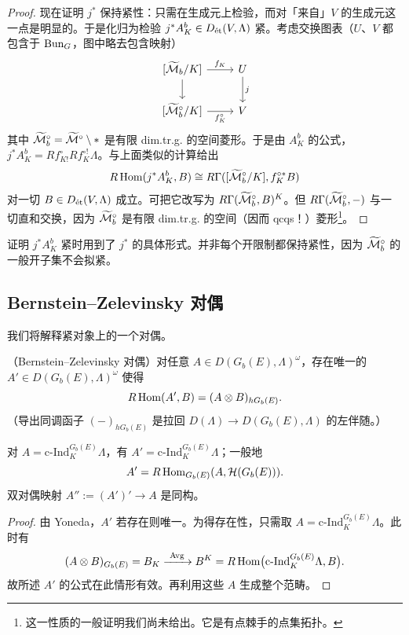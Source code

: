 \begin{proof}
现在证明 $j^*$ 保持紧性：只需在生成元上检验，而对「来自」$V$ 的生成元这一点是明显的。于是化归为检验 $j^*A^b_K\in D_{\et}(V,\Lambda)$ 紧。考虑交换图表（$U$、$V$ 都包含于 $\Bun_G$，图中略去包含映射）
\[
\begin{tikzcd}
{}[\wt\cM_b/K] \arrow[r, "f_K"] \arrow[d] & U \arrow[d, "j"] \\
{}[\wt\cM_b^\circ/K] \arrow[r, "f_K^\circ"'] & V
\end{tikzcd}
\]
其中 $\wt\cM_b^\circ=\wt\cM^\circ\setminus\ast$ 是有限 dim.tr.g. 的空间菱形。于是由 $A^b_K$ 的公式，$j^*A^b_K=Rf^\circ_{K!}Rf^{\circ!}_K\Lambda$。与上面类似的计算给出
\[
R\Hom(j^*A^b_K,B)\cong R\Gamma([\wt\cM_b^\circ/K],f^{\circ*}_K B)
\]
对一切 $B\in D_{\et}(V,\Lambda)$ 成立。可把它改写为 $R\Gamma(\wt\cM_b^\circ,B)^K$。但 $R\Gamma(\wt\cM_b^\circ,-)$ 与一切直和交换，因为 $\wt\cM_b^\circ$ 是有限 dim.tr.g. 的空间（因而 qcqs！）菱形\footnote{这一性质的一般证明我们尚未给出。它是有点棘手的点集拓扑。}。
\end{proof}

\begin{warning}
证明 $j^*A^b_K$ 紧时用到了 $j^*$ 的具体形式。并非每个开限制都保持紧性，因为 $\wt\cM_b^\circ$ 的一般开子集不会拟紧。
\end{warning}

\subsection{Bernstein–Zelevinsky 对偶}

我们将解释紧对象上的一个对偶。

\begin{proposition}
（Bernstein–Zelevinsky 对偶）对任意 $A\in D(G_b(E),\Lambda)^\omega$，存在唯一的 $A'\in D(G_b(E),\Lambda)^\omega$ 使得
\[
R\Hom(A',B)=(A\otimes B)_{hG_b(E)}.
\]
（导出同调函子 $(-)_{hG_b(E)}$ 是拉回 $D(\Lambda)\to D(G_b(E),\Lambda)$ 的左伴随。）

对 $A=\mathrm{c}\text{-}\mathrm{Ind}^{G_b(E)}_K\Lambda$，有 $A'=\mathrm{c}\text{-}\mathrm{Ind}^{G_b(E)}_K\Lambda$；一般地
\[
A'=R\Hom_{G_b(E)}(A,\cH(G_b(E))).
\]
双对偶映射 $A'':=(A')'\to A$ 是同构。
\end{proposition}


\begin{proof}
由 Yoneda，$A'$ 若存在则唯一。为得存在性，只需取 $A=\mathrm{c}\text{-}\mathrm{Ind}^{G_b(E)}_K\Lambda$。此时有
\[
(A\otimes B)_{G_b(E)}=B_K\xrightarrow{\ \mathrm{Avg}\ }B^K=R\Hom\bigl(\mathrm{c}\text{-}\mathrm{Ind}^{G_b(E)}_K\Lambda,B\bigr).
\]
故所述 $A'$ 的公式在此情形有效。再利用这些 $A$ 生成整个范畴。
\end{proof}


